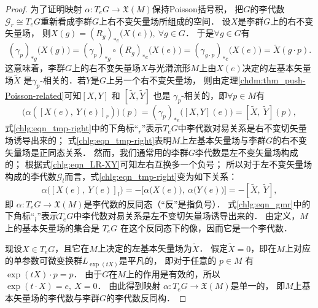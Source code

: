 \begin{proof}
    
    为了证明映射 $\alpha: T_e G \rightarrow \mathfrak{X}(M)$保持Poisson括号积，
    把$G$的李代数$\mathscr{G}_r\cong T_e G$重新看成李群$G$上右不变矢量场所组成的空间．
    设$X$是李群$G$上的右不变矢量场，
    则$X(g)= (R_g)_{*e}\bigl(X(e)\bigr), \ \forall g \in G $．
    于是$\forall g \in G$有
    \begin{equation*}
        (\gamma_p)_{* g}\bigl(X(g)\bigr) = (\gamma_p)_{* g} \circ (R_g)_{* e}\bigl(X(e)\bigr) 
        =(\gamma_{g\cdot p})_{* e}\bigl(X(e)\bigr)  =\widetilde{X}(g \cdot p) .
    \end{equation*}
    这意味着，李群$G$上的右不变矢量场$X$与光滑流形$M$上由$X(e)$决定的左基本矢量场$\widetilde{X}$
    是$\gamma_{p}$-相关的．若$Y$是$G$上另一个右不变矢量场，
    则由定理\ref{chdm:thm_push-Poisson-related}可知$[X, Y]$ 和 $[\widetilde{X}, \widetilde{Y}]$
    也是 $\gamma_{p}$-相关的，即$\forall p \in M$有
    \begin{equation}\label{chlg:eqn_tmp-right}
        \bigl(\alpha\left([X(e),\ Y(e)]_r\right)\bigr)(p)
        =(\gamma_p)_{*e}\bigl([X, Y](e)\bigr)
        =[\widetilde{X},\ \widetilde{Y}](p),
    \end{equation}
    式\eqref{chlg:eqn_tmp-right}中的下角标“${}_r$”表示$T_e G$中李代数对易关系是{\heiti 右}不变切矢量场诱导出来的；
    式\eqref{chlg:eqn_tmp-right}表明$M$上左基本矢量场与李群$G$的右不变矢量场是{\heiti 正同态}关系．
    然而，我们通常用的李群$G$李代数是左不变矢量场构成的；
    根据式\eqref{chlg:eqn_LR-XY}可知左右互换多一个负号；
    所以对于左不变矢量场构成的李代数$\mathscr{G}_l$而言，式\eqref{chlg:eqn_tmp-right}变为如下关系：
    \begin{equation}\label{chlg:eqn_gmr}
        \alpha\bigl([X(e),\ Y(e)]_l\bigr)=-\bigl[\alpha\bigl(X(e)\bigr),\ \alpha\bigl(Y(e)\bigr)\bigr]
        =-[\widetilde{X},\ \widetilde{Y}],
    \end{equation}
    即 $\alpha: T_e G \rightarrow \mathfrak{X}(M)$是李代数的{\heiti 反同态}（“反”是指负号）．
    式\eqref{chlg:eqn_gmr}中的下角标“${}_l$”表示$T_e G$中李代数对易关系是{\heiti 左}不变切矢量场诱导出来的．
    由定义，$M$上的基本矢量场的集合是 $T_e G$ 在这个反同态下的像，因而它是一个李代数．
    
    现设$X \in T_e G$，且它在$M$上决定的左基本矢量场为$\widetilde{X}$．
    假定$\widetilde{X}=0$，即在$M$上对应的单参数可微变换群$L_{\exp (t X)}$是平凡的，
    即对于任意的 $p \in M$ 有$ \exp (t  X)\cdot p=p$．
    由于$G$在$M$上的作用是有效的，所以
    $ \exp (t \cdot X)=e, \ X=0 $．
    由此得到映射 $\alpha: T_{e} G \rightarrow \mathfrak{X}(M)$是单一的，
    即$M$上基本矢量场的李代数与李群$G$的李代数反同构．
\end{proof}


